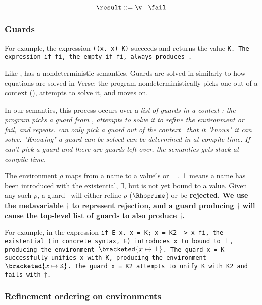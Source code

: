 \documentclass[manuscript,screen,review, 12pt, nonacm]{acmart}
\begin{document}
    \[\result\; \rm{::=}\; \v\; \vert \; \fail \]
    
    \subsubsection{Guards}

    For example, the \VMinus expression {\tt{((}\ttbackslash\tt{x. x) K)}}
    succeeds and returns the value \tt{K}. The \VMinus expression \tt{if  fi},
    the empty \tt{if-fi}, always produces \fail. 

    Like \VC, \VMinus has a nondeterministic semantics. Guards are solved in \VMinus
    similarly to how equations are solved in Verse: the program nondeterministically
    picks one out of a context (\context), attempts to solve it, and moves on. 

In our semantics, this process occurs over a \it{list} of guards \gs in a
context \context: the program picks a guard from \context, attempts to solve it
to refine the environment or fail, and repeats. \VMinus can only pick a guard
out of the context \context\ that it "knows" it can solve. "Knowing" a guard can
be solved can be determined in \VMinus at compile time. If \VMinus can't pick a
guard and there are guards left over, the semantics gets stuck at compile time. 



The environment $\rho$ maps from a name to a value {\v}s or $\bot$. $\bot$ means
a name has been introduced with the existential, $\exists$, but is not yet bound
to a value. Given any such $\rho$, a guard \g\ will either refine $\rho$
($\Rhoprime$) or be \bf{rejected}. We use the metavariable $\dagger$ to
represent rejection, and a guard producing $\dagger$ will cause the top-level
list of guards to also produce $\dagger$. 

    \gfail

  For example, in the \VMinus expression \tt{if E x. x = K; x = K2 -> x fi}, the
  existential (in concrete syntax, \tt{E}) introduces \tt{x} to \Rho bound to
  $\bot$, producing the environment $\bracketed{x \mapsto \bot}$. The guard
  \tt{x = K} successfully unifies \tt{x} with \tt{K}, producing the environment
  $\bracketed{x \mapsto \tt{K}}$. The guard \tt{x = K2} attempts to unify \tt{K}
  with \tt{K2} and fails with $\dagger$. 

    \subsubsection{Refinement ordering on environments}
\end{document}

